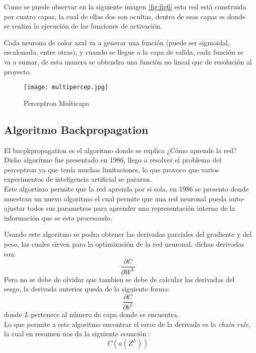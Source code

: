             Como se puede observar en la siguiente imagen \eqref{fig:fig6} esta red est\'a
            construida por cuatro capas, la cual de ellas dos son ocultas, dentro de esas 
            capas es donde se realiza la ejecuci\'on de las funciones de activaci\'on.

            Cada neurona de color azul va a generar una funci\'on (puede ser sigmoidal, escalonada, entre otras), 
            y cuando se llegue a la capa de salida, cada funci\'on se va a sumar, de esta manera 
            se obtendra una funci\'on no lineal que de resoluci\'on al proyecto.

            \begin{figure}[H]
                \centering
                \texttt{[image: multipercep.jpg]}
                \caption{Perceptron Multicapa}
                \label{fig:fig6}
            \end{figure}

            
        \subsection{Algoritmo Backpropagation}
            El bacpkpropagation es el algoritmo donde se explica ¿C\'omo aprende la red?
            Dicho algoritmo fue presentado en 1986, llego a resolver el problema del perceptron 
            ya que ten\'ia muchas limitaciones, lo que provoco que varios experimentos de inteligencia
            artificial se pararan.\\

            Este algortimo permite que la red aprenda por si sola, en 1986 se presento \cite{rumelhart1986} 
            donde muestran un nuevo algoritmo el cual permite que una red neuronal pueda auto-ajustar todos sus 
            parametros para aprender una representaci\'on interna de la informaci\'on que se esta procesando.

            Usando este algoritmo se podra obtener las derivadas parciales del gradiente y del peso, las cuales
            sirven para la optimizaci\'on de la red neuronal, dichas derivadas son:
            \begin{equation*}
                \frac{\partial C}{\partial W^L}
            \end{equation*}
            Pero no se debe de olvidar que tambien se debe de calcular las derivadas del sesgo, la derivada anterior
            queda de la siguiente forma:
            \begin{equation*}
                \frac{\partial C}{\partial b^L}
            \end{equation*}
            donde \textit{L} pertenece al n\'umero de capa donde se encuentra. \\
            Lo que permite a este algoritmo encontrar el error de la derivada es la \textit{chain rule}, la cual en resumen 
            nos da la siguiente ecuaci\'on :
            \begin{equation*}
                C(a(Z^L))
            \end{equation*}

